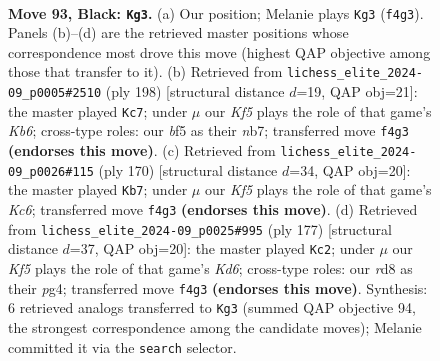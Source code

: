 \documentclass[11pt]{article}
\begin{document}
\clearpage

\begin{figure}[p]\centering
\begin{subfigure}{0.46\textwidth}\centering
\resizebox{\linewidth}{!}{%
\newchessgame
\chessboard[
  setfen={3R1Q1Q/8/8/5B2/5k2/8/8/7K b - - 0 93},
  showmover=false,
  pgfstyle=straightmove, color=movearrow, markmove={f4-g3}
]}
\caption{}
\end{subfigure}\hfill
\begin{subfigure}{0.46\textwidth}\centering
\resizebox{\linewidth}{!}{%
\newchessgame
\chessboard[
  setfen={8/1n6/1K6/8/8/5qk1/8/5q2 w - - 0 100},
  showmover=false,
  pgfstyle=straightmove, color=movearrow, markmove={b6-c7}
]}
\caption{}
\end{subfigure}
\\[4pt]
\begin{subfigure}{0.46\textwidth}\centering
\resizebox{\linewidth}{!}{%
\newchessgame
\chessboard[
  setfen={8/8/1bK5/8/8/8/6k1/6q1 w - - 2 86},
  showmover=false,
  pgfstyle=straightmove, color=movearrow, markmove={c6-b7}
]}
\caption{}
\end{subfigure}\hfill
\begin{subfigure}{0.46\textwidth}\centering
\resizebox{\linewidth}{!}{%
\newchessgame
\chessboard[
  setfen={6Q1/8/8/4QK2/3B2P1/3k4/8/8 b - - 0 89},
  showmover=false,
  pgfstyle=straightmove, color=movearrow, markmove={d3-c2}
]}
\caption{}
\end{subfigure}
\caption{\textbf{Move 93, Black: \texttt{Kg3}.} (a) Our position; Melanie plays \texttt{Kg3} (\texttt{f4g3}). Panels (b)--(d) are the retrieved master positions whose correspondence most drove this move (highest QAP objective among those that transfer to it). (b) Retrieved from \texttt{lichess\_elite\_2024-09\_p0005\#2510} (ply 198) [structural distance $d$=19, QAP obj=21]: the master played \texttt{Kc7}; under $\mu$ our \emph{Kf5} plays the role of that game's \emph{Kb6}; cross-type roles: our \emph{b}f5 as their \emph{n}b7; transferred move \texttt{f4g3} \textbf{(endorses this move)}. (c) Retrieved from \texttt{lichess\_elite\_2024-09\_p0026\#115} (ply 170) [structural distance $d$=34, QAP obj=20]: the master played \texttt{Kb7}; under $\mu$ our \emph{Kf5} plays the role of that game's \emph{Kc6}; transferred move \texttt{f4g3} \textbf{(endorses this move)}. (d) Retrieved from \texttt{lichess\_elite\_2024-09\_p0025\#995} (ply 177) [structural distance $d$=37, QAP obj=20]: the master played \texttt{Kc2}; under $\mu$ our \emph{Kf5} plays the role of that game's \emph{Kd6}; cross-type roles: our \emph{r}d8 as their \emph{p}g4; transferred move \texttt{f4g3} \textbf{(endorses this move)}. Synthesis: 6 retrieved analogs transferred to \texttt{Kg3} (summed QAP objective 94, the strongest correspondence among the candidate moves); Melanie committed it via the \texttt{search} selector.}
\label{fig:thought-m185}
\end{figure}
\end{document}
